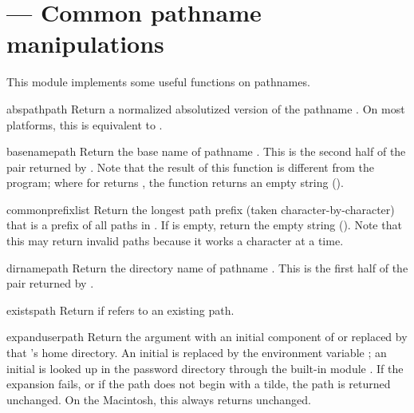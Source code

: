 \section{ ---
         Common pathname manipulations}


This module implements some useful functions on pathnames.



\begin{funcdesc}{abspath}{path}
Return a normalized absolutized version of the pathname .
On most platforms, this is equivalent to
.
\end{funcdesc}

\begin{funcdesc}{basename}{path}
Return the base name of pathname .  This is the second half
of the pair returned by .  Note that the
result of this function is different from the
\UNIX{}  program; where  for
 returns , the 
function returns an empty string ().
\end{funcdesc}

\begin{funcdesc}{commonprefix}{list}
Return the longest path prefix (taken character-by-character) that is a
prefix of all paths in 
.  If  is empty, return the empty string
().  Note that this may return invalid paths because it works a
character at a time.
\end{funcdesc}

\begin{funcdesc}{dirname}{path}
Return the directory name of pathname .  This is the first
half of the pair returned by .
\end{funcdesc}

\begin{funcdesc}{exists}{path}
Return  if  refers to an existing path.
\end{funcdesc}

\begin{funcdesc}{expanduser}{path}
Return the argument with an initial component of \samp{\~} or
 replaced by that 's home directory.  An
initial \samp{\~{}} is replaced by the environment variable
; an initial  is looked up in the
password directory through the built-in module
.  If the expansion fails, or if the
path does not begin with a tilde, the path is returned unchanged.  On
the Macintosh, this always returns  unchanged.
\end{funcdesc}

